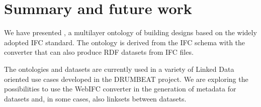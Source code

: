 \section{Summary and future work}
\label{sec:conclusion}

We have presented \ifcowl{}, a multilayer ontology of building designs based on the widely adopted IFC standard. The ontology is 
derived from the IFC schema with the  converter that can also produce RDF datasets from IFC files. 

The \ifcowl{} ontologies and \ifcrdf{} datasets are currently used in a variety of Linked Data oriented use cases \cite{torma2013semantic} developed in the DRUMBEAT project. We are exploring the possibilities to use the WebIFC converter in the generation of metadata for \ifcrdf{} datasets and, in some cases, also linksets between datasets.


